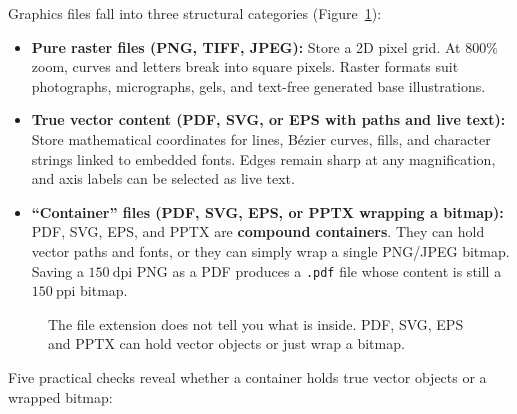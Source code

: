 Graphics files fall into three structural categories (Figure~\ref{fig:ch13-04}):
\begin{itemize}
\item \textbf{Pure raster files (PNG, TIFF, JPEG):} Store a 2D pixel grid. At $800\%$ zoom, curves and letters break into square pixels. Raster formats suit photographs, micrographs, gels, and text-free generated base illustrations.
\item \textbf{True vector content (PDF, SVG, or EPS with paths and live text):} Store mathematical coordinates for lines, B\'{e}zier curves, fills, and character strings linked to embedded fonts. Edges remain sharp at any magnification, and axis labels can be selected as live text.
\item \textbf{``Container'' files (PDF, SVG, EPS, or PPTX wrapping a bitmap):} PDF, SVG, EPS, and PPTX are \textbf{compound containers}. They can hold vector paths and fonts, or they can simply wrap a single PNG/JPEG bitmap. Saving a $150\ \text{dpi}$ PNG as a PDF produces a \texttt{.pdf} file whose content is still a $150\ \text{ppi}$ bitmap.
\end{itemize}

\begin{figure}[htbp]\centering
\resizebox{\linewidth}{!}{}
\caption{The file extension does not tell you what is inside. PDF, SVG, EPS and PPTX can hold vector objects or just wrap a bitmap.}\label{fig:ch13-04}
\end{figure}

Five practical checks reveal whether a container holds true vector objects or a wrapped bitmap:

